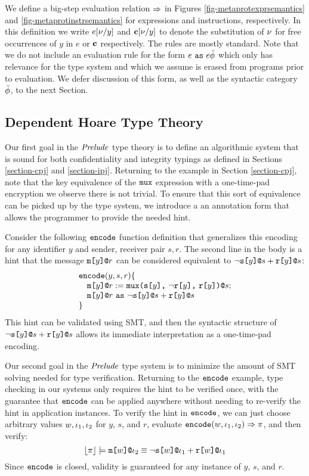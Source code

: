 \metaprotexprsemanticsfig

We define a big-step evaluation relation $\Rightarrow$ in Figures
\ref{fig-metaprotexprsemantics} and \ref{fig-metaprotinstrsemantics}
for expressions and instructions, respectively.  In this definition we
write $e[\nu/y]$ and $\mathbf{c}[\nu/y]$ to denote the substitution of
$\nu$ for free occurrences of $y$ in $e$ or $\mathbf{c}$ respectively. The
rules are mostly standard. Note that we do not include an evaluation
rule for the form $e\ \texttt{as}\ e{\breve{\phi}}$ which only has
relevance for the type system and which we assume is erased from
programs prior to evaluation. We defer discussion of this form,
as well as the syntactic category $\breve{\phi}$, to the next
Section.


\metaprotinstrsemanticsfig

\subsection{Dependent Hoare Type Theory}

Our first goal in the $\mathit{Prelude}$ type theory is to define an
algorithmic system that is sound for both confidentiality and
integrity typings as defined in Sections \ref{section-cpj} and
\ref{section-ipj}. Returning to the example in Section
\ref{section-cpj}, note that the key equivalence of the $\texttt{mux}$
expression with a one-time-pad encryption we observe there
is not trivial. To ensure that this sort of equivalence
can be picked up by the type system, we introduce a
an annotation form that allows the programmer to provide
the needed hint.

Consider the following $\texttt{encode}$ function definition that
generalizes this encoding for any identifier $y$ and sender, receiver
pair $s,r$. The second line in the body is a hint that
the message $\texttt{m[}y\texttt{]}\texttt{@}r$ can be considered equivalent to
$\neg\texttt{s[}y\texttt{]}\texttt{@}s + \texttt{r[}y\texttt{]}\texttt{@}s$:
$$
\begin{array}{l}
\texttt{encode}(y,s,r) \{\\
\quad \texttt{m[}y\texttt{]}\texttt{@}r := \texttt{mux(} \texttt{s[}y\texttt{]} \texttt{,}\ \neg\texttt{r[}y\texttt{]} \texttt{,}\ \texttt{r[}y\texttt{]} \texttt{)}\texttt{@}s;\\
\quad \texttt{m[}y\texttt{]}\texttt{@}r\ \texttt{as}\ \neg\texttt{s[}y\texttt{]}\texttt{@}s + \texttt{r[}y\texttt{]}\texttt{@}s\\
\}
\end{array}
$$
This hint can be validated using SMT, and then the
syntactic structure of $\neg\texttt{s[}y\texttt{]}\texttt{@}s + \texttt{r[}y\texttt{]}\texttt{@}s$
allows its immediate interpretation as a one-time-pad encoding.

Our second goal in the $\mathit{Prelude}$ type system is to minimize the
amount of SMT solving needed for type verification.  Returning to the
$\texttt{encode}$ example, type checking in our systems only requires the
hint to be verified once, with the guarantee that $\texttt{encode}$ can
be applied anywhere without needing to re-verify the hint in
application instances. To verify the hint in $\texttt{encode}$, we can
just choose arbitrary values $w,\iota_1,\iota_2$ for $y$, $s$, and $r$,
evaluate $\texttt{encode}(w,\iota_1,\iota_2) \Rightarrow \pi$, and then verify:
$$\lfloor \pi \rfloor \models \texttt{m[}w\texttt{]}\texttt{@}\iota_2 \equiv
\neg\texttt{s[}w\texttt{]}\texttt{@}\iota_1 + \texttt{r[}w\texttt{]}\texttt{@}\iota_1$$ 
Since $\texttt{encode}$ is closed, validity is guaranteed for
any instance of $y$, $s$, and $r$.


